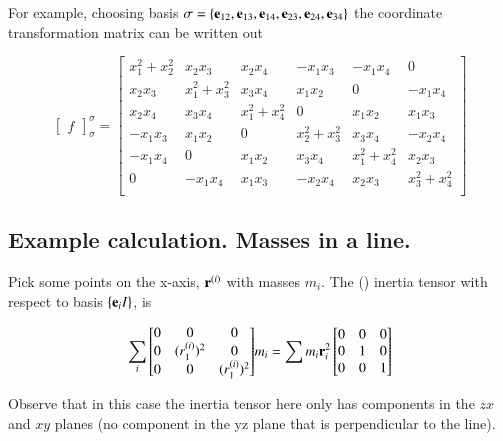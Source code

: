 \documentclass{article}      %
\begin{document}
For example, choosing basis $\sigma = \{ \mathbf{e}_{12}, \mathbf{e}_{13}, \mathbf{e}_{14}, \mathbf{e}_{23}, \mathbf{e}_{24}, \mathbf{e}_{34} \}$ the coordinate transformation matrix can be written out

\[
{\begin{bmatrix}
f
\end{bmatrix}}_\sigma^\sigma
=
\begin{bmatrix}
x_1^2 + x_2^2     &     x_2 x_3      &     x_2 x_4    &     -x_1 x_3      &    -x_1 x_4    &     0 \\
x_2 x_3           & x_1^2 + x_3^2    &     x_3 x_4      &     x_1 x_2    &            0  & -x_1 x_4 \\
x_2 x_4           &  x_3 x_4         & x_1^2 + x_4^2    &         0    &      x_1 x_2    & x_1 x_3 \\
-x_1 x_3          &  x_1 x_2         &          0     & x_2^2 + x_3^2  &      x_3 x_4    & -x_2 x_4 \\
-x_1 x_4          &  0             &     x_1 x_2      &     x_3 x_4    & x_1^2 + x_4^2   & x_2 x_3 \\
   0            &  -x_1 x_4        &     x_1 x_3      &    -x_2 x_4    &      x_2 x_3    &  x_3^2 + x_4^2 \\
\end{bmatrix}
\]

\subsection{ Example calculation.  Masses in a line. }

Pick some points on the x-axis, $\mathbf{r}^{(i)}$ with masses $m_i$.
The () inertia tensor with respect to basis $\{\mathbf{e}_i I\}$, is

\[
\sum_i {
\begin{bmatrix}
 0 & 0               & 0      \\
 0 & (r^{(i)}_1)^2     & 0      \\
 0 & 0               & (r^{(i)}_1)^2  \\
\end{bmatrix}
} m_i
= \sum{ m_i \mathbf{r}_i^2}
\begin{bmatrix}
0 & 0 & 0 \\
0 & 1 & 0 \\
0 & 0 & 1 \\
\end{bmatrix}
\]

Observe that in this case the inertia tensor here only has components in the $zx$ and $xy$ planes (no component in the yz plane that is perpendicular to the line).
\end{document}
